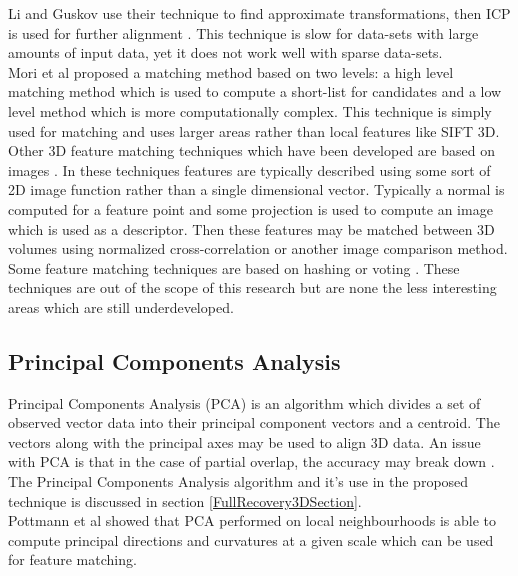 Li and Guskov use their technique to find approximate transformations, then ICP is used for further alignment \cite{Besl92Method,Chen92Object}. This technique is slow for data-sets with large amounts of input data, yet it does not work well with sparse data-sets. \\

	
Mori et al \cite{Mori05Efficient} proposed a matching method based on two levels: a high level matching method which is used to compute a short-list for candidates and a low level method which is more computationally complex. This technique is simply used for matching and uses larger areas rather than local features like SIFT 3D. \\

Other 3D feature matching techniques which have been developed are based on images \cite{Wolfson97Geometric,Johnson97Spin}. In these techniques features are typically described using some sort of 2D image function rather than a single dimensional vector. Typically a normal is computed for a feature point and some projection is used to compute an image which is used as a descriptor. Then these features may be matched between 3D volumes using normalized cross-correlation or another image comparison method.  \\

Some feature matching techniques are based on hashing or voting \cite{Germain97Fingerprint,Gal06Salient,Mitra04Registration,Ballard91Generalizing}. These techniques are out of the scope of this research but are none the less interesting areas which are still underdeveloped.


\subsection{Principal Components Analysis}

Principal Components Analysis (PCA) is an algorithm which divides a set of observed vector data into their principal component vectors and a centroid. The vectors along with the principal axes may be used to align 3D data. An issue with PCA is that in the case of partial overlap, the accuracy may break down \cite{Aiger084}. The Principal Components Analysis algorithm and it's use in the proposed technique is discussed in section \ref{FullRecovery3DSection}. \\

Pottmann et al \cite{Pottmann07Principal} showed that PCA performed on local neighbourhoods is able to compute principal directions and curvatures at a given scale which can be used for feature matching. \\

